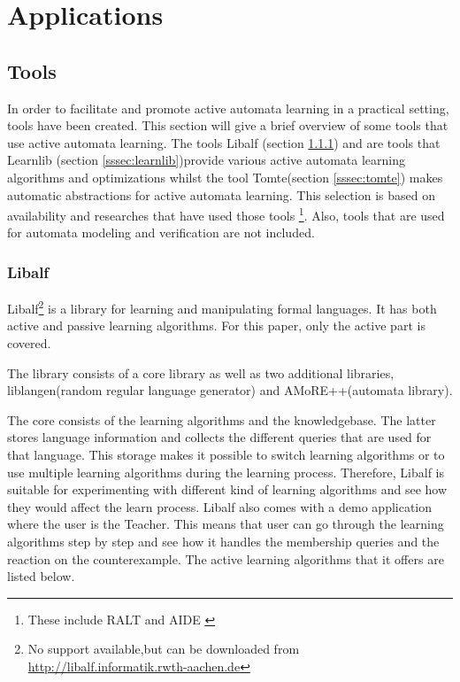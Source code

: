 \documentclass[multi,crop=false,class=article]{standalone}
\begin{document}
\section{Applications}
\label{sec:applications}

\subsection{Tools}
\label{ssec:tools}

In order to facilitate and promote active automata learning in a practical 
setting, tools have been created. This section will give a brief overview of 
some tools that use active automata learning. The tools  Libalf (section 
\ref{sssec:libalf}) and are tools that Learnlib (section
\ref{sssec:learnlib})provide various active automata learning algorithms and 
optimizations whilst the tool Tomte(section \ref{sssec:tomte}) makes automatic 
abstractions for active automata learning. This selection is based on 
availability and researches that have used those tools \footnote{These include 
RALT\cite{Shahbaz2014} and AIDE \cite{Cicala2016}}. Also, tools that are used 
for automata modeling and verification are not included.

\subsubsection{Libalf}
\label{sssec:libalf}
Libalf\footnote{No support available,but can be downloaded from 
	\url{http://libalf.informatik.rwth-aachen.de}} is a library for learning 
and manipulating formal languages. It has both active and passive learning 
algorithms. For this paper, only the active part is covered.

The library consists of a core library as well as two additional libraries, 
liblangen(random regular language generator) and AMoRE++(automata library).

The core consists of the learning algorithms and the knowledgebase. The latter 
stores language information and collects the different queries that are used 
for that language. This storage makes it possible to switch learning algorithms 
or to use multiple learning algorithms during the learning process. Therefore, 
Libalf is suitable for experimenting with different kind of learning algorithms 
and see how they would affect the learn process. Libalf also comes with a demo 
application where the user is the Teacher. This means that user can go through 
the learning algorithms step by step and see how it handles the membership 
queries and the reaction on the counterexample. The active learning algorithms 
that it offers are listed below.
\end{document}
